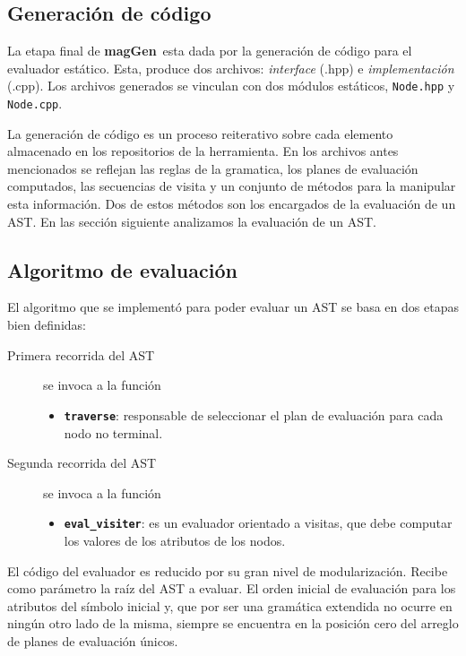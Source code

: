 \documentclass[runningheads,a4paper]{llncs}
\newcommand{\textbtt}[1]{\texttt{\textbf{#1}}}
\newcommand{\maggen}{\textbf{magGen}}
\begin{document}
\subsection{Generación de código}

La etapa final de \maggen\ esta dada por la generación de código para el evaluador estático. Esta, produce dos archivos: \textit{interface} (.hpp) e \textit{implementación} (.cpp). Los archivos generados se vinculan con dos módulos estáticos, \texttt{Node.hpp} y \texttt{Node.cpp}.

La generación de código es un proceso reiterativo sobre cada elemento almacenado en los repositorios de la herramienta. En los archivos antes mencionados se reflejan las reglas de la gramatica, los planes de evaluación computados, las secuencias de visita y un conjunto de métodos para la manipular esta información. Dos de estos métodos son los encargados de la evaluación de un AST. En las sección siguiente analizamos la evaluación de un AST.

\subsection{Algoritmo de evaluación}
\label{sec:codcppalgeval}

El algoritmo que se implementó para poder evaluar un AST se basa en dos etapas bien definidas:

\begin{description}
\item [Primera recorrida del AST] se invoca a la función
\begin{itemize}
\item \textbtt{traverse}: responsable de seleccionar el plan de evaluación para cada nodo no terminal.
\end{itemize}

\item [Segunda recorrida del AST] se invoca a la función
\begin{itemize}
\item \textbtt{eval\_visiter}: es un evaluador orientado a visitas, que debe computar los valores de los atributos de los nodos.
\end{itemize}
\end{description}

El código del evaluador es reducido por su gran nivel de modularización. Recibe como parámetro la raíz del AST a evaluar. El orden inicial de evaluación para los atributos del símbolo inicial y, que por ser una gramática extendida no ocurre en ningún otro lado de la misma, siempre se encuentra en la posición cero del arreglo de planes de evaluación únicos.
\end{document}
